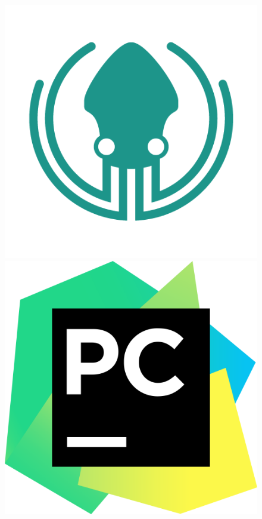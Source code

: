 \begin{figure}[ht]
  \includegraphics[height=\developmentToolsLogosHeight]{assets/tools/development/gitkraken.png}
  \includegraphics[height=\developmentToolsLogosHeight]{assets/tools/development/pycharm.png}

\end{figure}
